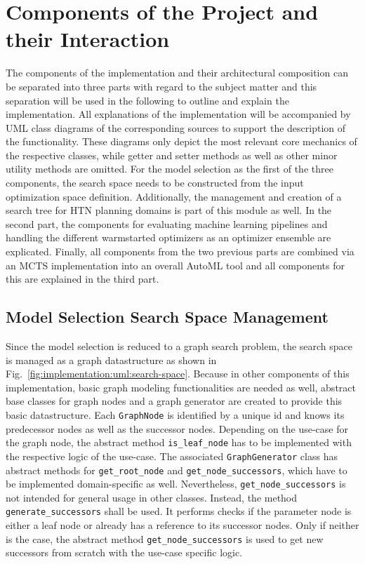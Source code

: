 \section{Components of the Project and their Interaction}
\label{sec:implementation:components}
The components of the implementation and their architectural composition can be separated into three parts with regard to the subject matter and this separation will be used in the following to outline and explain the implementation.
All explanations of the implementation will be accompanied by UML class diagrams of the corresponding sources to support the description of the functionality.
These diagrams only depict the most relevant core mechanics of the respective classes, while getter and setter methods as well as other minor utility methods are omitted.\newline 
For the model selection as the first of the three components, the search space needs to be constructed from the input optimization space definition.
Additionally, the management and creation of a search tree for HTN planning domains is part of this module as well.\newline
In the second part, the components for evaluating machine learning pipelines and handling the different warmstarted optimizers as an optimizer ensemble are explicated.\newline
Finally, all components from the two previous parts are combined via an MCTS implementation into an overall AutoML tool and all components for this are explained in the third part.

\subsection{Model Selection Search Space Management}
\label{sec:implementation:components:search-space}
Since the model selection is reduced to a graph search problem, the search space is managed as a graph datastructure as shown in Fig.~\ref{fig:implementation:uml:search-space}.
Because in other components of this implementation, basic graph modeling functionalities are needed as well, abstract base classes for graph nodes and a graph generator are created to provide this basic datastructure.\newline
Each \texttt{GraphNode} is identified by a unique id and knows its predecessor nodes as well as the successor nodes.
Depending on the use-case for the graph node, the abstract method \texttt{is\_leaf\_node} has to be implemented with the respective logic of the use-case.\newline
The associated \texttt{GraphGenerator} class has abstract methods for \texttt{get\_root\_node} and \texttt{get\_node\_successors}, which have to be implemented domain-specific as well.
Nevertheless, \texttt{get\_node\_successors} is not intended for general usage in other classes.
Instead, the method \texttt{generate\_successors} shall be used.
It performs checks if the parameter node is either a leaf node or already has a reference to its successor nodes.
Only if neither is the case, the abstract method \texttt{get\_node\_successors} is used to get new successors from scratch with the use-case specific logic.

